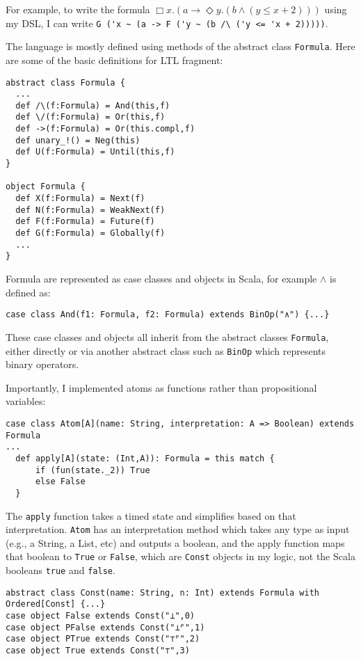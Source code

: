 \documentclass[a4paper]{article}
\begin{document}
For example, to write the formula $\Box x. (a \to \Diamond y. (b \land (y \leq x + 2)))$ using my DSL, I can write \lstinline{G ('x ~ (a -> F ('y ~ (b /\ ('y <= 'x + 2)))))}.

The language is mostly defined using methods of the abstract class \lstinline{Formula}. Here are some of the basic definitions for LTL fragment:
\begin{lstlisting}[label=lstbasic]
abstract class Formula {
  ...
  def /\(f:Formula) = And(this,f)
  def \/(f:Formula) = Or(this,f)
  def ->(f:Formula) = Or(this.compl,f)
  def unary_!() = Neg(this)
  def U(f:Formula) = Until(this,f)
}

object Formula {
  def X(f:Formula) = Next(f)
  def N(f:Formula) = WeakNext(f)
  def F(f:Formula) = Future(f)
  def G(f:Formula) = Globally(f)
  ...
}
\end{lstlisting}
Formula are represented as case classes and objects in Scala, for example $\land$ is defined as:
\begin{lstlisting}
case class And(f1: Formula, f2: Formula) extends BinOp("∧") {...}
\end{lstlisting}
These case classes and objects all inherit from the abstract classes \lstinline{Formula}, either directly or via another abstract class such as \lstinline{BinOp} which represents binary operators.

Importantly, I implemented atoms as functions rather than propositional variables:
\begin{lstlisting}
case class Atom[A](name: String, interpretation: A => Boolean) extends Formula
...
  def apply[A](state: (Int,A)): Formula = this match {
      if (fun(state._2)) True
      else False
  }
\end{lstlisting}

The \texttt{apply} function takes a timed state and simplifies based on that interpretation. \texttt{Atom} has an interpretation method which takes any type as input (e.g., a String, a List, etc) and outputs a boolean, and the apply function maps that boolean to \texttt{True} or \texttt{False}, which are \texttt{Const} objects in my logic, not the Scala booleans \texttt{true} and \texttt{false}.
\begin{lstlisting}
abstract class Const(name: String, n: Int) extends Formula with Ordered[Const] {...}
case object False extends Const("⊥",0)
case object PFalse extends Const("⊥ᴾ",1)
case object PTrue extends Const("⊤ᴾ",2)
case object True extends Const("⊤",3)
\end{lstlisting}
\end{document}
